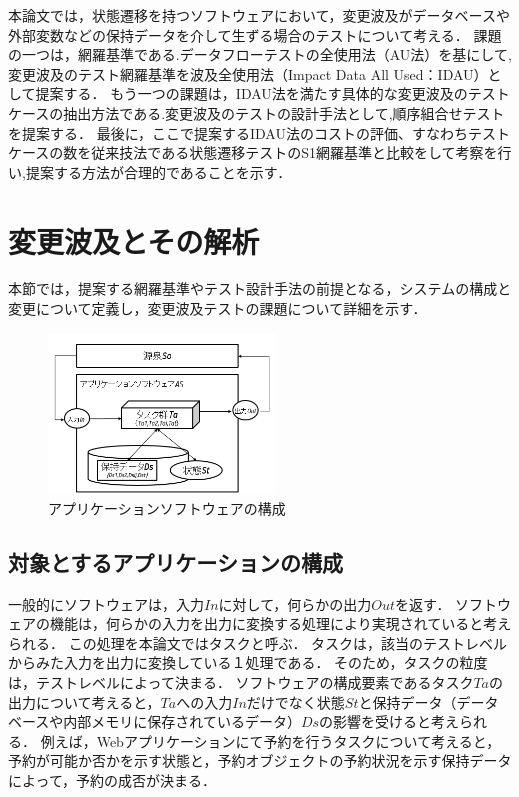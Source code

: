 \documentclass[a4paper,12pt]{jreport}
\begin{document}
本論文では，状態遷移を持つソフトウェアにおいて，変更波及がデータベースや外部変数などの保持データを介して生ずる場合のテストについて考える．
課題の一つは，網羅基準である.データフローテストの全使用法（AU法）\cite{beiz90}を基にして,変更波及のテスト網羅基準を波及全使用法（Impact Data All Used：IDAU）として提案する．
もう一つの課題は，IDAU法を満たす具体的な変更波及のテストケースの抽出方法である.変更波及のテストの設計手法として,順序組合せテストを提案する．
最後に，ここで提案するIDAU法のコストの評価、すなわちテストケースの数を従来技法である状態遷移テストのS1網羅基準と比較をして考察を行い,提案する方法が合理的であることを示す．



\section{変更波及とその解析}
本節では，提案する網羅基準やテスト設計手法の前提となる，システムの構成と変更について定義し，変更波及テストの課題について詳細を示す．

\begin{figure}[t]
  \begin{center}
  \includegraphics[width=6cm]{./image/fig-1.png}
  \caption{アプリケーションソフトウェアの構成}
  \label{fig:fig-1}
  \end{center}
\end{figure}

\subsection{対象とするアプリケーションの構成}
一般的にソフトウェアは，入力$In$に対して，何らかの出力$Out$を返す．
ソフトウェアの機能は，何らかの入力を出力に変換する処理により実現されていると考えられる．
この処理を本論文ではタスクと呼ぶ．
タスクは，該当のテストレベルからみた入力を出力に変換している１処理である．
そのため，タスクの粒度は，テストレベルによって決まる．%
ソフトウェアの構成要素であるタスク$Ta$の出力について考えると，$Ta$への入力$In$だけでなく状態$St$と保持データ（データベースや内部メモリに保存されているデータ）$Ds$の影響を受けると考えられる．
例えば，Webアプリケーションにて予約を行うタスクについて考えると，予約が可能か否かを示す状態と，予約オブジェクトの予約状況を示す保持データによって，予約の成否が決まる．
\end{document}
